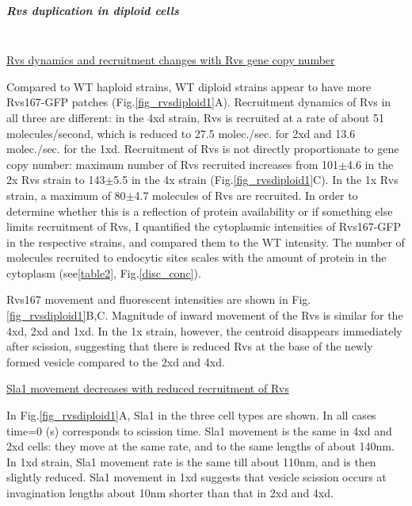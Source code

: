 		

		\subparagraph{Rvs duplication in diploid cells}
		\label{sub_rvsdiploids}
			\mbox{}\\
			
			 \underline{Rvs dynamics and recruitment changes with Rvs gene copy number}
			 
Compared to WT haploid strains, WT diploid strains appear to have more Rvs167-GFP patches (Fig.\ref{fig_rvsdiploid1}A). 
Recruitment dynamics of Rvs in all three are different: in the 4xd strain, Rvs is recruited at a rate of about 51 molecules/second, which is reduced to 27.5 molec./sec. for 2xd and 13.6 molec./sec. for the 1xd. Recruitment of Rvs is not directly proportionate to gene copy number: maximum number of Rvs recruited increases from 101$\pm$4.6 in the 2x Rvs strain to 143$\pm$5.5 in the 4x strain (Fig.\ref{fig_rvsdiploid1}C). In the 1x Rvs strain, a maximum of 80$\pm$4.7 molecules of Rvs are recruited. In order to determine whether this is a reflection of protein availability or if something else limits recruitment of Rvs, I quantified the cytoplasmic intensities of Rvs167-GFP in the respective strains, and compared them to the WT intensity. The number of molecules recruited to endocytic sites scales with the amount of protein in the cytoplasm (see\ref{table2}, Fig.\ref{disc_conc}).  

\vspace{5mm}
Rvs167 movement and fluorescent intensities are shown in Fig.\ref{fig_rvsdiploid1}B,C. 
Magnitude of inward movement of the Rvs is similar for the 4xd, 2xd and 1xd. In the 1x strain, however, the centroid disappears immediately after scission, suggesting that there is reduced Rvs at the base of the newly formed vesicle compared to the 2xd and 4xd.

\vspace{5mm}
\underline{Sla1 movement decreases with reduced recruitment of Rvs}

In Fig.\ref{fig_rvsdiploid1}A, Sla1 in the three cell types are shown. In all cases time=0 (s) corresponds to scission time. Sla1 movement is the same in 4xd and 2xd cells: they move at the same rate, and to the same lengths of about 140nm. In 1xd strain, Sla1 movement rate is the same till about 110nm, and is then slightly reduced. Sla1 movement in 1xd suggests that vesicle scission occurs at invagination lengths about 10nm shorter than that in 2xd and 4xd. 


